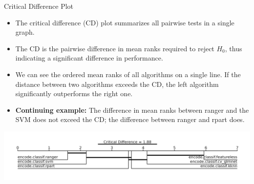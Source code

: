 \documentclass[11pt,compress,t,notes=noshow, xcolor=table]{beamer}
\begin{document}
\begin{frame}{Critical Difference Plot}

\begin{itemize}
    \itemsep1em
    \item The critical difference (CD) plot summarizes all pairwise tests in a single graph.
    \item The CD is the pairwise difference in mean ranks required to reject $H_0$, thus indicating a significant difference in performance.
    \item We can see the ordered mean ranks of all algorithms on a single line. If the distance between two algorithms exceeds the CD, the left algorithm significantly outperforms the right one.
    \item \textbf{Continuing example:} The difference in mean ranks between ranger and the SVM does not exceed the CD; the difference between ranger and rpart does.
\end{itemize}
\includegraphics[width = 1.3\textwidth]{figure/crit_diff_plot.png}
\end{frame}
\end{document}

